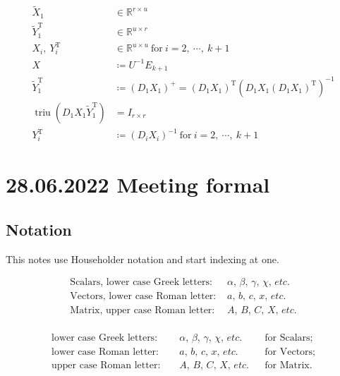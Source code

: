 \documentclass[11pt]{article}
\newcommand{\triu}{\mathop{\mathrm{triu}}}
\newcommand{\T}{\mathrm{T}}
\begin{document}
\begin{align*}
    \tilde{X}_{1} &\in \mathbb{R}^{r \times u} \\
    \tilde{Y}_{1}^{\T} &\in \mathbb{R}^{u \times r} \\
    X_{i},\ Y_{i}^{\T} &\in \mathbb{R}^{u \times u} \ \text{for} \ i = 2,\ \cdots,\ k+1 \\
    X &\coloneqq U^{-1} E_{k+1} \\
    \tilde{Y}_{1}^{\T} &\coloneqq (D_{1} X_{1})^{+} = (D_{1} X_{1})^{\T} (D_{1} X_{1} (D_{1} X_{1})^{\T})^{-1} \\
    \triu(D_{1} X_{1} \tilde{Y}_{1}^{\T}) &= I_{r \times r}\\
    Y_{i}^{\T} &\coloneqq (D_{i} X_{i})^{-1} \ \text{for}\ i = 2,\ \cdots,\ k+1 
\end{align*}



\newpage

\section{28.06.2022 Meeting formal}

\subsection{Notation}

\noindent This notes use Householder notation and start indexing at one.

\begin{align*}
    \text{Scalars, lower case Greek letters: }& \alpha,\, \beta,\, \gamma,\, \chi,\, etc.\\
    \text{Vectors, lower case Roman letter: }& a,\, b,\, c,\, x,\, etc.\\
    \text{Matrix, upper case Roman letter: }& A,\, B,\, C,\, X,\, etc.\\
\end{align*}

\begin{align*}
    \text{lower case Greek letters: } && \alpha,\, \beta,\, \gamma,\, \chi,\, etc. && \text{for Scalars;}\\
    \text{lower case Roman letter: }&& a,\, b,\, c,\, x,\, etc. && \text{for Vectors;}\\
    \text{upper case Roman letter: }&& A,\, B,\, C,\, X,\, etc. && \text{for Matrix.}\\
\end{align*}
\end{document}
